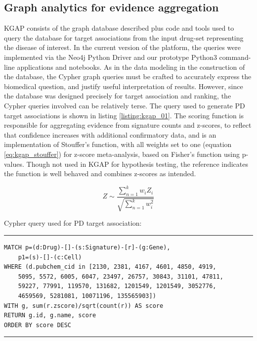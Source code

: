 \subsection{Graph analytics for evidence aggregation}

KGAP consists of the graph database described plus code and tools used to query the database for target associations from the input drug-set representing the disease of interest. In the current version of the platform, the queries were implemented via the Neo4j Python Driver\cite{Neo4j_Inc_undated-ly} and our prototype Python3 command-line applications and notebooks. As in the data modeling in the construction of the database, the Cypher graph queries must be crafted to accurately express the biomedical question, and justify useful interpretation of results. However, since the database was designed precisely for target association and ranking, the Cypher queries involved can be relatively terse. The query used to generate PD target associations is shown in listing \ref{listing:kgap_01}. The scoring function is responsible for aggregating evidence from signature counts and z-scores, to reflect that confidence increases with additional confirmatory data, and is an implementation of Stouffer's function, with all weights set to one (equation \ref{eq:kgap_stouffer}) for z-score meta-analysis, based on Fisher's function using p-values\cite{Rosenthal1978-in}. Though not used in KGAP for hypothesis testing, the reference indicates the function is well behaved and combines z-scores as intended. 

\begin{equation}
Z \sim \frac{\sum_{n=1}^{k}w_iZ_i}{\sqrt{\sum_{n=1}^{k}w_i^2}}
\label{eq:kgap_stouffer}
\end{equation}

Cypher query used for PD target association:\\
\rule[0.5ex]{\linewidth}{1pt}
\begin{singlespace}
\begin{lstlisting}[caption=KGAP Cypher query,label=listing:kgap_01]
MATCH p=(d:Drug)-[]-(s:Signature)-[r]-(g:Gene),
    p1=(s)-[]-(c:Cell)
WHERE (d.pubchem_cid in [2130, 2381, 4167, 4601, 4850, 4919, 
    5095, 5572, 6005, 6047, 23497, 26757, 30843, 31101, 47811, 
    59227, 77991, 119570, 131682, 1201549, 1201549, 3052776, 
    4659569, 5281081, 10071196, 135565903])
WITH g, sum(r.zscore)/sqrt(count(r)) AS score
RETURN g.id, g.name, score
ORDER BY score DESC
\end{lstlisting}
\rule[0.5ex]{\linewidth}{1pt}
\end{singlespace}

